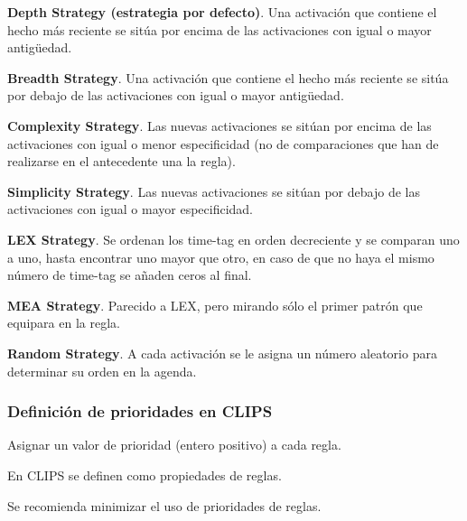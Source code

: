 \begin{compactitem}
  \item \textbf{Depth Strategy (estrategia por defecto)}. Una activación que contiene el hecho
    más reciente se sitúa por encima de las activaciones con igual o mayor antigüedad.
 \item \textbf{Breadth Strategy}. Una activación que contiene el hecho más reciente se
    sitúa por debajo de las activaciones con igual o mayor antigüedad.
 \item \textbf{Complexity Strategy}. Las nuevas activaciones se sitúan por encima de las
    activaciones con igual o menor especificidad (no de comparaciones que han de
    realizarse en el antecedente una la regla).
 \item \textbf{Simplicity Strategy}. Las nuevas activaciones se sitúan por debajo de las
    activaciones con igual o mayor especificidad.
 \item \textbf{LEX Strategy}. Se ordenan los time-tag en orden decreciente y se comparan
    uno a uno, hasta encontrar uno mayor que otro, en caso de que no haya el mismo
    número de time-tag se añaden ceros al final.
 \item \textbf{MEA Strategy}. Parecido a LEX, pero mirando sólo el primer patrón que
    equipara en la regla.
 \item \textbf{Random Strategy}. A cada activación se le asigna un número aleatorio para
    determinar su orden en la agenda.
\end{compactitem}

\subsubsection{Definición de prioridades en CLIPS}
\begin{compactitem}
  \item Asignar un valor de prioridad (entero positivo) a cada regla.
  \item En CLIPS se definen como propiedades de reglas.
  \item Se recomienda minimizar el uso de prioridades de reglas.
\end{compactitem}

